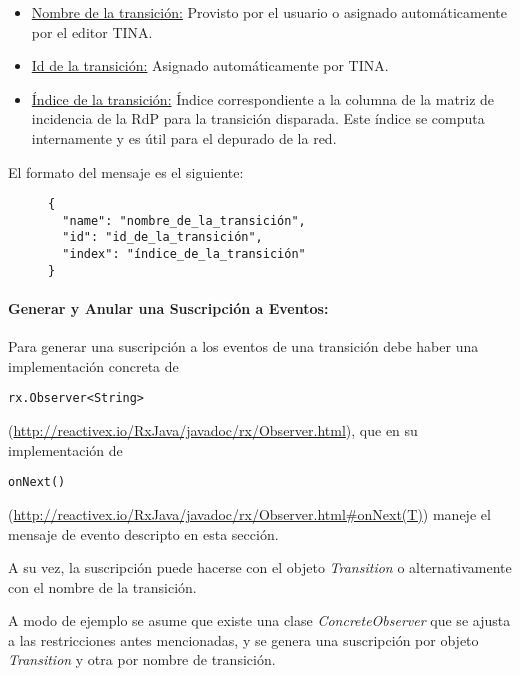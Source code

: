 \begin{itemize}
    \item \underline{Nombre de la transición:} Provisto por el usuario o
    asignado automáticamente por el editor TINA.
    \item \underline{Id de la transición:} Asignado automáticamente por TINA.
    \item \underline{Índice de la transición:} Índice correspondiente a la
    columna de la matriz de incidencia de la RdP para la transición disparada.
    Este índice se computa internamente y es útil para el depurado de la red.
\end{itemize}

El formato del mensaje es el siguiente:

\begin{figure}[H]
\centering
\begin{verbatim}
{
  "name": "nombre_de_la_transición",
  "id": "id_de_la_transición",
  "index": "índice_de_la_transición"
}
\end{verbatim}
\end{figure}

\paragraph{Generar y Anular una Suscripción a Eventos:}
Para generar una suscripción a los eventos de una transición debe haber una
implementación concreta de
\begin{verbatim}
rx.Observer<String>
\end{verbatim} 
(\url{http://reactivex.io/RxJava/javadoc/rx/Observer.html}), que en su
implementación de
\begin{verbatim}
onNext()
\end{verbatim} 
(\url{http://reactivex.io/RxJava/javadoc/rx/Observer.html#onNext(T)})
maneje el mensaje de evento descripto en esta sección.

A su vez, la suscripción puede hacerse con el objeto \textit{Transition} o
alternativamente con el nombre de la transición.

A modo de ejemplo se asume que existe una clase \textit{ConcreteObserver} que se
ajusta a las restricciones antes mencionadas, y se genera una suscripción por
objeto \textit{Transition} y otra por nombre de transición.

